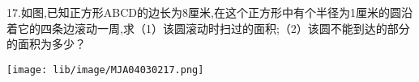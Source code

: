 17.如图,已知正方形ABCD的边长为8厘米,在这个正方形中有个半径为1厘米的圆沿着它的四条边滚动一周,求（1）该圆滚动时扫过的面积;（2）该圆不能到达的部分的面积为多少？

\begin{flushright}

    \texttt{[image: lib/image/MJA04030217.png]}

\end{flushright}



